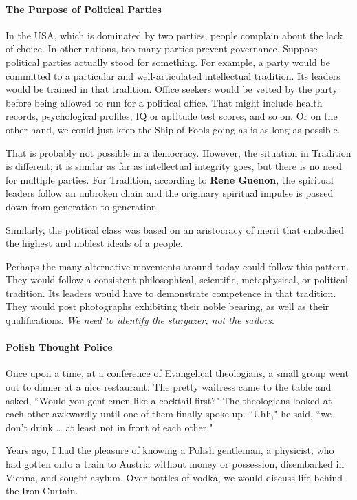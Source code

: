 \paragraph{The Purpose of Political Parties}
In the USA, which is dominated by two parties, people complain about the lack of choice. In other nations, too many parties prevent governance. Suppose political parties actually stood for something. For example, a party would be committed to a particular and well-articulated intellectual tradition. Its leaders would be trained in that tradition. Office seekers would be vetted by the party before being allowed to run for a political office. That might include health records, psychological profiles, IQ or aptitude test scores, and so on. Or on the other hand, we could just keep the Ship of Fools going as is as long as possible.

That is probably not possible in a democracy. However, the situation in Tradition is different; it is similar as far as intellectual integrity goes, but there is no need for multiple parties. For Tradition, according to \textbf{Rene Guenon}, the spiritual leaders follow an unbroken chain and the originary spiritual impulse is passed down from generation to generation.

Similarly, the political class was based on an aristocracy of merit that embodied the highest and noblest ideals of a people.

Perhaps the many alternative movements around today could follow this pattern. They would follow a consistent philosophical, scientific, metaphysical, or political tradition. Its leaders would have to demonstrate competence in that tradition. They would post photographs exhibiting their noble bearing, as well as their qualifications. \emph{We need to identify the stargazer, not the sailors}.

\paragraph{Polish Thought Police}
\begin{quotex}
Once upon a time, at a conference of Evangelical theologians, a small group went out to dinner at a nice restaurant. The pretty waitress came to the table and asked, ``Would you gentlemen like a cocktail first?" The theologians looked at each other awkwardly until one of them finally spoke up. ``Uhh," he said, ``we don't drink … at least not in front of each other." 

\end{quotex}
Years ago, I had the pleasure of knowing a Polish gentleman, a physicist, who had gotten onto a train to Austria without money or possession, disembarked in Vienna, and sought asylum. Over bottles of vodka, we would discuss life behind the Iron Curtain.

